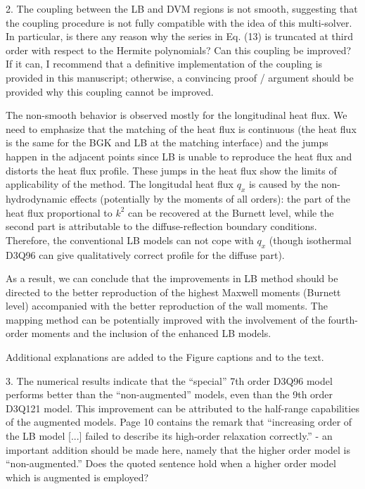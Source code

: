 \documentclass{article}
\begin{document}
\begin{leftbar}
\end{leftbar}

\begin{quoting}
    2. The coupling between the LB and DVM regions is not
    smooth, suggesting that the coupling procedure is not
    fully compatible with the idea of this multi-solver.
    In particular, is there any reason why the series in
    Eq. (13) is truncated at third order with respect to
    the Hermite polynomials? Can this coupling be improved?
    If it can, I recommend that a definitive implementation
    of the coupling is provided in this manuscript; otherwise,
    a convincing proof / argument should be provided why this
    coupling cannot be improved.
\end{quoting}

The non-smooth behavior is observed mostly for the longitudinal heat flux.
We need to emphasize that the matching of the heat flux is continuous
(the heat flux is the same for the BGK and LB at the matching interface)
and the jumps happen in the adjacent points
since LB is unable to reproduce the heat flux and distorts the heat flux profile.
These jumps in the heat flux show the limits of applicability of the method.
The longitudal heat flux $q_x$ is caused by the non-hydrodynamic effects
(potentially by the moments of all orders):
the part of the heat flux proportional to $k^2$ can be recovered at the Burnett level,
while the second part is attributable to the diffuse-reflection boundary conditions.
Therefore, the conventional LB models can not cope with $q_x$
(though isothermal D3Q96 can give qualitatively correct profile for the diffuse part).

As a result, we can conclude that the improvements in LB method should be directed
to the better reproduction of the highest Maxwell moments (Burnett level)
accompanied with the better reproduction of the wall moments.
The mapping method can be potentially improved with the involvement of the fourth-order moments
and the inclusion of the enhanced LB models.

Additional explanations are added to the Figure captions and to the text.

\begin{leftbar}
\end{leftbar}

\begin{quoting}
    3. The numerical results indicate that the ``special''
    7th order D3Q96 model performs better than the
    ``non-augmented'' models, even than the 9th order
    D3Q121 model. This improvement can be attributed to
    the half-range capabilities of the augmented models.
    Page 10 contains the remark that ``increasing order of
    the LB model [...] failed to describe its high-order
    relaxation correctly.'' - an important addition should
    be made here, namely that the higher order model is
    ``non-augmented.'' Does the quoted sentence hold when
    a higher order model which is augmented is employed?
\end{quoting}
\end{document}
